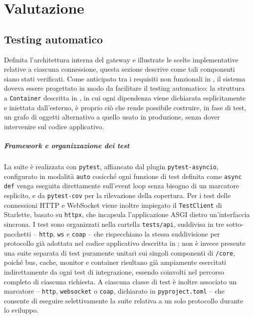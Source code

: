 \chapter{Valutazione}
\label{chap:valutazione}
%
\section{Testing automatico}
\label{sec:testing-automatico}
%
Definita l'architettura interna del gateway e illustrate le scelte implementative relative a ciascuna connessione, questa sezione descrive come tali componenti siano stati verificati. Come anticipato tra i requisiti non funzionali in , il sistema doveva essere progettato in modo da facilitare il testing automatico: la struttura a \texttt{Container} descritta in , in cui ogni dipendenza viene dichiarata esplicitamente e iniettata dall'esterno, è proprio ciò che rende possibile costruire, in fase di test, un grafo di oggetti alternativo a quello usato in produzione, senza dover intervenire sul codice applicativo.

\paragraph{Framework e organizzazione dei test}
La suite è realizzata con \texttt{pytest}, affiancato dal plugin \texttt{pytest-asyncio}, configurato in modalità \texttt{auto} cosicché ogni funzione di test definita come \texttt{async def} venga eseguita direttamente sull'event loop senza bisogno di un marcatore esplicito, e da \texttt{pytest-cov} per la rilevazione della copertura. Per i test delle connessioni \ac{HTTP} e WebSocket viene inoltre impiegato il \texttt{TestClient} di Starlette, basato su \texttt{httpx}, che incapsula l'applicazione \ac{ASGI} dietro un'interfaccia sincrona. I test sono organizzati nella cartella \texttt{tests/api}, suddivisa in tre sotto-pacchetti -- \texttt{http}, \texttt{ws} e \texttt{coap} -- che rispecchiano la stessa suddivisione per protocollo già adottata nel codice applicativo descritta in ; non è invece presente una suite separata di test puramente unitari sui singoli componenti di \texttt{/core}, poiché bus, cache, monitor e container risultano già ampiamente esercitati indirettamente da ogni test di integrazione, essendo coinvolti nel percorso completo di ciascuna richiesta. A ciascuna classe di test è inoltre associato un marcatore -- \texttt{http}, \texttt{websocket} o \texttt{coap}, dichiarato in \texttt{pyproject.toml} -- che consente di eseguire selettivamente la suite relativa a un solo protocollo durante lo sviluppo.

